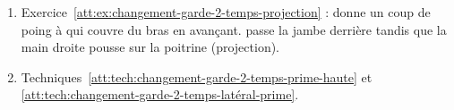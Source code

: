 \begin{enumerate}
	\item Exercice~\ref{att:ex:changement-garde-2-temps-projection} : \A donne un coup de poing à \D qui couvre du bras en avançant.
	\D passe la jambe derrière \D tandis que la main droite pousse sur la poitrine (projection).
	
	\item Techniques~\ref{att:tech:changement-garde-2-temps-prime-haute} et \ref{att:tech:changement-garde-2-temps-latéral-prime}.
\end{enumerate}

